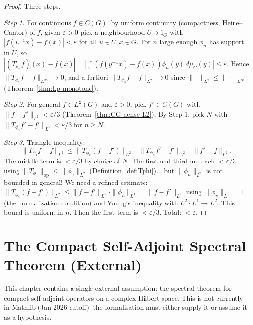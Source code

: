 \begin{proof}
  Three steps.

  \emph{Step 1.} For continuous $f \in C(G)$, by uniform continuity
  (compactness, Heine--Cantor) of $f$, given $\varepsilon > 0$ pick a
  neighbourhood $U \ni 1_G$ with $|f(u^{-1} x) - f(x)| < \varepsilon$
  for all $u \in U, x \in G$. For $n$ large enough $\phi_n$ has support
  in $U$, so
  $|(T_{\phi_n} f)(x) - f(x)|
   = |\int (f(y^{-1}x) - f(x))\phi_n(y)\,d\mu_G(y)| \leq \varepsilon$.
  Hence $\|T_{\phi_n} f - f\|_{L^\infty} \to 0$, and a fortiori
  $\|T_{\phi_n} f - f\|_{L^2} \to 0$ since
  $\|\cdot\|_{L^2} \leq \|\cdot\|_{L^\infty}$ (Theorem~\ref{thm:Lp-monotone}).

  \emph{Step 2.} For general $f \in L^2(G)$ and $\varepsilon > 0$, pick
  $f' \in C(G)$ with $\|f - f'\|_{L^2} < \varepsilon/3$
  (Theorem~\ref{thm:CG-dense-L2}). By Step 1, pick $N$ with
  $\|T_{\phi_n}f' - f'\|_{L^2} < \varepsilon/3$ for $n \geq N$.

  \emph{Step 3.} Triangle inequality:
  \[
     \|T_{\phi_n}f - f\|_{L^2} \leq
     \|T_{\phi_n}(f - f')\|_{L^2}
     + \|T_{\phi_n}f' - f'\|_{L^2}
     + \|f' - f\|_{L^2}.
  \]
  The middle term is $< \varepsilon/3$ by choice of $N$. The first and
  third are each $< \varepsilon/3$ using
  $\|T_{\phi_n}\|_{\mathrm{op}} \leq \|\phi_n\|_{L^2}$
  (Definition~\ref{def:Tphi})... but $\|\phi_n\|_{L^2}$ is not
  bounded in general! We need a refined estimate:
  $\|T_{\phi_n}(f - f')\|_{L^2} \leq \|f - f'\|_{L^2}\cdot\|\phi_n\|_{L^1}
   = \|f - f'\|_{L^2}$
  using $\|\phi_n\|_{L^1} = 1$ (the normalization condition) and Young's
  inequality with $L^2 \cdot L^1 \to L^2$. This bound is uniform in $n$.
  Then the first term is $< \varepsilon/3$. Total: $< \varepsilon$.
\end{proof}


\chapter{The Compact Self-Adjoint Spectral Theorem (External)}
\label{chap:spectral}

This chapter contains a single external assumption: the spectral
theorem for compact self-adjoint operators on a complex Hilbert space.
This is not currently in Mathlib (Jan 2026 cutoff); the formalisation
must either supply it or assume it as a hypothesis.

